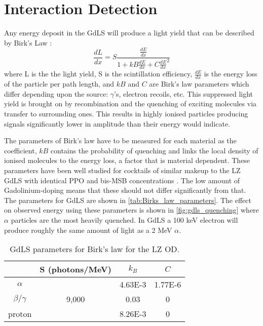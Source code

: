 \section{Interaction Detection}
\label{sec:od_physics}
\par
Any energy deposit in the GdLS will produce a light yield that can be described by Birk's Law \cite{birks_law_ref}:
\begin{equation} 
    \frac{dL}{dx} = S \frac{\frac{dE}{dx}}{1 + kB\frac{dE}{dx} + C\frac{dE}{dx}^2}
    \label{eq:birkslaw}
\end{equation}
where L is the the light yield, S is the scintillation efficiency, $\frac{dE}{dx}$ is the energy loss of the particle per path length, and $kB$ and $C$ are Birk's law parameters which differ depending upon the source: $\gamma$'s, electron recoils, etc.
This suppressed light yield is brought on by recombination and the quenching of exciting molecules via transfer to surrounding ones.
This results in highly ionised particles producing signals significantly lower in amplitude than their energy would indicate.
\par
The parameters of Birk's law have to be measured for each material as the coefficient, $kB$ contains the probability of quenching and links the local density of ionised molecules to the energy loss, a factor that is material dependent. 
These parameters have been well studied for cocktails of similar makeup to the LZ GdLS with identical PPO and bis-MSB concentrations \cite{ls_alpha_quenching_ref,ls_proton_quenching_ref}.
The low amount of Gadolinium-doping means that these should not differ significantly from that.
The parameters for GdLS are shown in \autoref{tab:Birks_law_parameters}.
The effect on observed energy using these parameters is shown in \autoref{fig:gdls_quenching} where $\alpha$ particles are the most heavily quenched.
In GdLS a 100 keV electron will produce roughly the same amount of light as a 2 MeV $\alpha$.

\begin{table}[]
    \centering
    \begin{tabular}{c | c | c | c }
                   & S (photons/MeV) & $k_{B}$ & $C$ \\ \hline
    $\alpha$       &                 & 4.63E-3 & 1.77E-6 \\
    $\beta/\gamma$ & 9,000           & 0.03    & 0 \\ 
    proton         &                 & 8.26E-3 & 0
    \end{tabular}
    \caption{GdLS parameters for Birk's law for the LZ OD.}
    \label{tab:Birks_law_parameters}
\end{table} 

